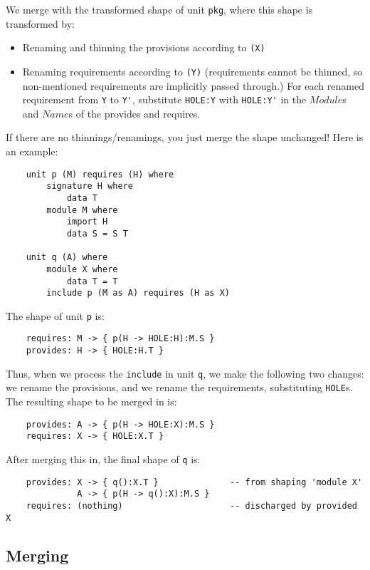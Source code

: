 \documentclass{article}
\newcommand{\I}[1]{\ensuremath{\mathit{#1}}}
\begin{document}
We merge with the transformed shape of unit \verb|pkg|, where this
shape is transformed by:

\begin{itemize}
    \item Renaming and thinning the provisions according to \verb|(X)|
    \item Renaming requirements according to \verb|(Y)| (requirements cannot
          be thinned, so non-mentioned requirements are implicitly passed through.)
          For each renamed requirement from \verb|Y| to \verb|Y'|,
          substitute \verb|HOLE:Y| with \verb|HOLE:Y'| in the
          \I{Module}s and \I{Name}s of the provides and requires.
\end{itemize}
%
If there are no thinnings/renamings, you just merge the
shape unchanged! Here is an example:

\begin{verbatim}
    unit p (M) requires (H) where
        signature H where
            data T
        module M where
            import H
            data S = S T

    unit q (A) where
        module X where
            data T = T
        include p (M as A) requires (H as X)
\end{verbatim}
%
The shape of unit \verb|p| is:

\begin{verbatim}
    requires: M -> { p(H -> HOLE:H):M.S }
    provides: H -> { HOLE:H.T }
\end{verbatim}
%
Thus, when we process the \verb|include| in unit \verb|q|,
we make the following two changes: we rename the provisions,
and we rename the requirements, substituting \verb|HOLE|s.
The resulting shape to be merged in is:

\begin{verbatim}
    provides: A -> { p(H -> HOLE:X):M.S }
    requires: X -> { HOLE:X.T }
\end{verbatim}
%
After merging this in, the final shape of \verb|q| is:

\begin{verbatim}
    provides: X -> { q():X.T }              -- from shaping 'module X'
              A -> { p(H -> q():X):M.S }
    requires: (nothing)                     -- discharged by provided X
\end{verbatim}

\newpage

\subsection{Merging}
\end{document}
